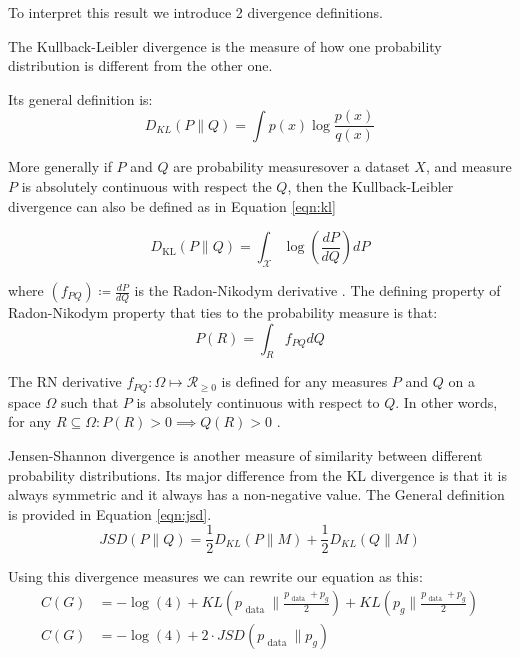 {To interpret this result we introduce 2 divergence definitions.
\begin{definition}
    The Kullback-Leibler divergence is the measure of how one probability distribution is different from
    the other one.   
\end{definition}
Its general definition is:
\begin{equation}
    D_{K L}(P \| Q)=\int p(x) \log \frac{p(x)}{q(x)}
\end{equation}

More generally if $P$ and $Q$ are probability measures\footnotemark  over a dataset $X$, and measure
$P$ is absolutely continuous with respect the $Q$, then the Kullback-Leibler divergence can also be
defined as in Equation \ref{eqn:kl}

\begin{equation}
    \label{eqn:kl}
    D_{\mathrm{KL}}(P \| Q)=\int_{\mathcal{X}} \log \left(\frac{d P}{d Q}\right) d P
\end{equation}

where $(f_{PQ}) \coloneqq \frac{d P}{dQ} $ is the Radon-Nikodym derivative \cite{Bill86}. The defining property of
Radon-Nikodym property that ties to the probability measure is that:
\begin{equation}
    \label{eqn:radon}
    P(R) = \int_{R} f_{PQ} d Q
\end{equation}

The RN derivative $f_{PQ} : \Omega \mapsto \mathcal{R}_{\geq 0}$ is defined for any measures $P$ and
$Q$ on a space $\Omega$ such that $P$ is absolutely continuous with respect to $Q$. In other words,
for any $ R \subseteq  \Omega : P(R) > 0 \implies Q(R) > 0$  \cite{Bill86}.

Jensen-Shannon divergence is another measure of similarity between different probability
distributions.  Its major difference from the KL divergence is that it is always symmetric and it
always has a non-negative value. The General definition is provided in Equation \ref{eqn:jsd}.
\begin{equation}
    \label{eqn:jsd}
    J S D(P \| Q)=\frac{1}{2} D_{K L}(P \| M)+\frac{1}{2} D_{K L}(Q \| M)
\end{equation}

Using this divergence measures we can rewrite our equation as this:
\begin{align}
    \label{eqn:gan_eqaul}
    C(G)&=-\log (4)+K L\left(p_{\text { data }} \| \frac{p_{\text { data }}+p_{g}}{2}\right)+K L\left(p_{g} \| \frac{p_{\text { data }}+p_{g}}{2}\right) \\
    C(G)&=-\log (4)+2 \cdot J S D\left(p_{\text { data }} \| p_{g}\right)
\end{align}

}
